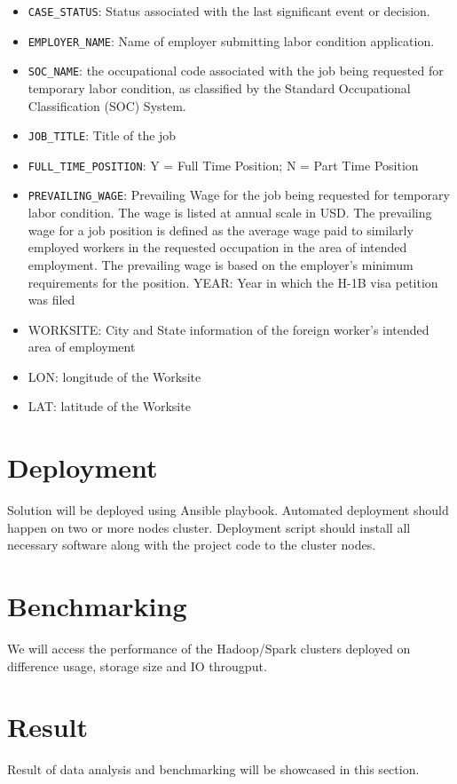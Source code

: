 \documentclass[9pt,twocolumn,twoside]{styles/osajnl}
\begin{document}
\begin{itemize}
 \item  \verb|CASE_STATUS|: Status associated with the last significant event or decision.
 \item \verb|EMPLOYER_NAME|: Name of employer submitting labor condition application.
 \item  \verb|SOC_NAME|: the occupational code associated with the job being requested for temporary labor condition, as classified by the Standard Occupational Classification (SOC) System.
 \item  \verb|JOB_TITLE|: Title of the job
 \item  \verb|FULL_TIME_POSITION|: Y = Full Time Position; N = Part Time Position
 \item  \verb|PREVAILING_WAGE|: Prevailing Wage for the job being requested for temporary labor condition. The wage is listed at annual scale in USD. The prevailing wage for a job position is defined as the average wage paid to similarly employed workers in the requested occupation in the area of intended employment. The prevailing wage is based on the employer’s minimum requirements for the position. 
 YEAR: Year in which the H-1B visa petition was filed
 \item  WORKSITE: City and State information of the foreign worker's intended area of employment
 \item  LON: longitude of the Worksite
 \item  LAT: latitude of the Worksite
\end{itemize}

\section{Deployment}
Solution will be deployed using Ansible \cite{wiki-ansible} playbook. Automated deployment should happen on two or more nodes cluster. Deployment script should install all necessary software along with the project code to the cluster nodes.

\section{Benchmarking}
We will access the performance of the Hadoop/Spark clusters deployed on difference usage, storage size and IO througput. 

\section{Result}
Result of data analysis and benchmarking will be showcased in this section. 
\end{document}
